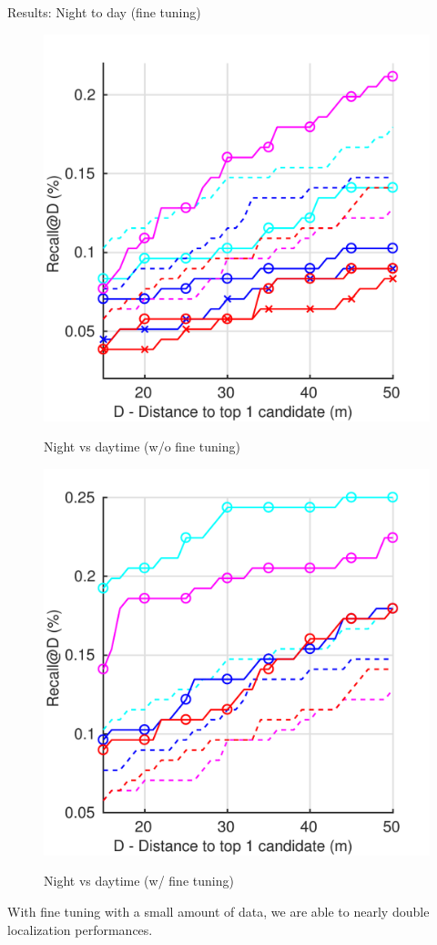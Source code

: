 \begin{frame}{Results: Night to day (fine tuning)}
	\begin{minipage}{0.49\linewidth}
		\centering
		\begin{figure}
			\includegraphics[width=0.9\linewidth]{vect/res/night}
			
			{Night vs daytime (w/o fine tuning)}
		\end{figure}
	\end{minipage}\hfill
	\begin{minipage}{0.49\linewidth}
		\centering
		\begin{figure}
			\includegraphics[width=0.9\linewidth]{vect/res/nightft}
			
			{Night vs daytime (w/ fine tuning)}
		\end{figure}
	\end{minipage}
	\vfill 
	
	{\small With fine tuning with a small amount of data, we are able to nearly double localization performances.}
\end{frame}